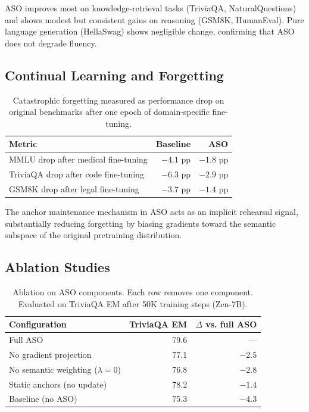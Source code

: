 \documentclass[11pt,a4paper]{article}
\begin{document}
ASO improves most on knowledge-retrieval tasks (TriviaQA, NaturalQuestions) and shows
modest but consistent gains on reasoning (GSM8K, HumanEval). Pure language generation
(HellaSwag) shows negligible change, confirming that ASO does not degrade fluency.

\subsection{Continual Learning and Forgetting}

\begin{table}[H]
\centering
\caption{Catastrophic forgetting measured as performance drop on original benchmarks
after one epoch of domain-specific fine-tuning.}
\begin{tabular}{lrr}
\toprule
\textbf{Metric} & \textbf{Baseline} & \textbf{ASO} \\
\midrule
MMLU drop after medical fine-tuning   & $-4.1$ pp & $-1.8$ pp \\
TriviaQA drop after code fine-tuning  & $-6.3$ pp & $-2.9$ pp \\
GSM8K drop after legal fine-tuning    & $-3.7$ pp & $-1.4$ pp \\
\bottomrule
\end{tabular}
\label{tab:forgetting}
\end{table}

The anchor maintenance mechanism in ASO acts as an implicit rehearsal signal,
substantially reducing forgetting by biasing gradients toward the semantic subspace of
the original pretraining distribution.

\subsection{Ablation Studies}

\begin{table}[H]
\centering
\caption{Ablation on ASO components. Each row removes one component. Evaluated on
TriviaQA EM after 50K training steps (Zen-7B).}
\begin{tabular}{lrr}
\toprule
\textbf{Configuration} & \textbf{TriviaQA EM} & \textbf{$\Delta$ vs. full ASO} \\
\midrule
Full ASO                         & 79.6 & --- \\
No gradient projection           & 77.1 & $-2.5$ \\
No semantic weighting ($\lambda=0$) & 76.8 & $-2.8$ \\
Static anchors (no update)       & 78.2 & $-1.4$ \\
Baseline (no ASO)                & 75.3 & $-4.3$ \\
\bottomrule
\end{tabular}
\label{tab:ablation}
\end{table}
\end{document}

